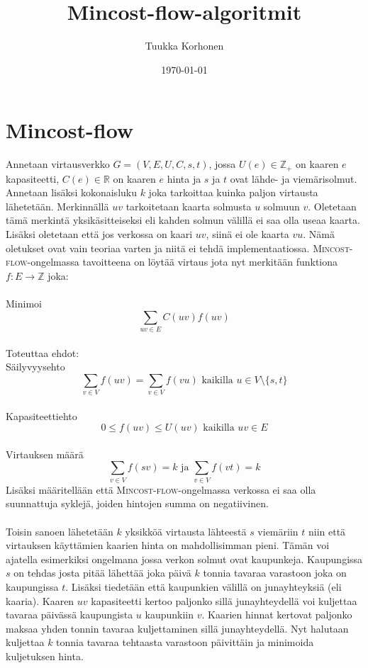 \documentclass[a4paper, 11pt]{article}
\title{Mincost-flow-algoritmit}
\author{Tuukka Korhonen}
\date{\today}
\begin{document}
\maketitle
\noindent
\section*{Mincost-flow}
Annetaan virtausverkko $G = (V, E, U, C, s, t)$, jossa $U(e) \in \mathbb{Z_+}$ on 
kaaren $e$ kapasiteetti, $C(e) \in \mathbb{R}$ on kaaren $e$ hinta ja $s$ ja $t$
ovat lähde- ja viemärisolmut. Annetaan lisäksi kokonaisluku $k$ joka tarkoittaa
kuinka paljon virtausta lähetetään. Merkinnällä $uv$ tarkoitetaan kaarta solmusta
$u$ solmuun $v$. Oletetaan tämä merkintä yksikäsitteiseksi eli 
kahden solmun välillä ei
saa olla useaa kaarta. Lisäksi oletetaan että jos verkossa on kaari $uv$, siinä
ei ole kaarta $vu$. Nämä oletukset ovat vain teoriaa varten ja niitä ei tehdä
implementaatiossa. \textsc{Mincost-flow}-ongelmassa tavoitteena on löytää virtaus jota 
nyt merkitään funktiona
$f : E \rightarrow \mathbb{Z}$ joka: \\\\ Minimoi $$\sum_{uv \in E} C(uv) f(uv)$$\\
Toteuttaa ehdot:\\ Säilyvyysehto
$$\sum_{v \in V} f(uv) = \sum_{v \in V} f(vu) \text{ kaikilla } u \in V \setminus \{s, t\}$$
\\Kapasiteettiehto
$$0 \le f(uv) \le U(uv) \text{ kaikilla } uv \in E$$
\\Virtauksen määrä
$$\sum_{v \in V} f(sv) = k \text{ ja } \sum_{v \in V} f(vt) = k$$
Lisäksi määritellään että \textsc{Mincost-flow}-ongelmassa verkossa ei saa olla
suunnattuja syklejä, joiden hintojen summa on negatiivinen.\\\\

\noindent
Toisin sanoen lähetetään $k$ yksikköä virtausta lähteestä $s$ viemäriin $t$ niin
että virtauksen käyttämien kaarien hinta on mahdollisimman pieni. Tämän voi ajatella
esimerkiksi ongelmana jossa verkon solmut ovat kaupunkeja. Kaupungissa $s$ on tehdas
josta pitää lähettää joka päivä $k$ tonnia tavaraa varastoon joka on kaupungissa $t$.
Lisäksi tiedetään että kaupunkien välillä on junayhteyksiä (eli kaaria). Kaaren $uv$
kapasiteetti kertoo paljonko sillä junayhteydellä voi kuljettaa tavaraa päivässä
kaupungista $u$ kaupunkiin $v$. Kaarien hinnat kertovat paljonko maksaa yhden tonnin
tavaraa kuljettaminen sillä junayhteydellä. Nyt halutaan kuljettaa $k$ tonnia tavaraa
tehtaasta varastoon päivittäin ja minimoida  kuljetuksen hinta.\\\\
\end{document}
